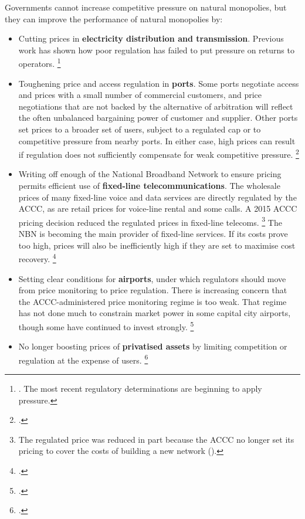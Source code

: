 Governments cannot increase competitive pressure on natural monopolies, but they can improve the performance of natural monopolies by:
\begin{itemize}
\item Cutting prices in \textbf{electricity distribution and transmission}. Previous work has shown how poor regulation has failed to put pressure on returns to operators.%
\footnote{\textcites{WoodHunterOTooleEtAl2012}{AERdeterminations}. The most recent regulatory determinations are beginning to apply pressure.}
\item Toughening price and access regulation in \textbf{ports}. Some ports negotiate access and prices with a small number of commercial customers, and price negotiations that are not backed by the alternative of arbitration will reflect the often unbalanced bargaining power of customer and supplier. Other ports set prices to a broader set of users, subject to a regulated cap or to competitive pressure from nearby ports. In either case, high prices can result if regulation does not sufficiently compensate for weak competitive pressure.%
\footcites{ACCC-ports-reg-2016}{Vic-port-reg-2015}{QLD-ports-2017}{ESC-ports-2014}
\item Writing off enough of the National Broadband Network to ensure pricing permits efficient use of \textbf{fixed-line telecommunications}. The wholesale prices of many fixed-line voice and data services are directly regulated by the ACCC, as are retail prices for voice-line rental and some calls. A 2015 ACCC pricing decision reduced the regulated prices in fixed-line telecoms.%
\footnote{The regulated price was reduced in part because the ACCC no longer set its pricing to cover the costs of building a new network (\textcite{ACCC_fixedlineprice_2015}).}  
The NBN is becoming the main provider of fixed-line services. If its costs prove too high, prices will also be inefficiently high if they are set to maximise cost recovery.%
\footcite{ACCCCommsMarketStudyDraft2017}
\item Setting clear conditions for \textbf{airports}, under which regulators should move from price monitoring to price regulation. There is increasing concern that the ACCC-administered price monitoring regime is too weak. That regime has not done much to constrain market power in some capital city airports, though some have continued to invest strongly.%
\footcites{PC-airport-2012}{ACCC_Airports_2015-16}{ABC_sims-airport_2017}
\item No longer boosting prices of \textbf{privatised assets} by limiting competition or regulation at the expense of users.%
\footcite{ACCC_privatise_smart_2016}
\end{itemize}

